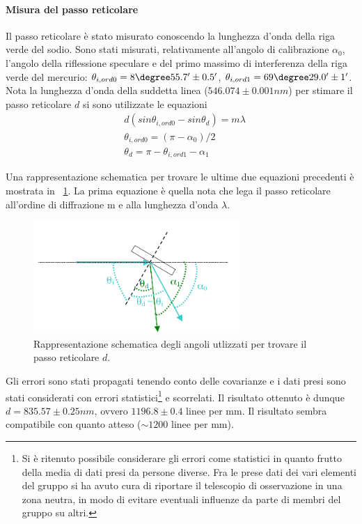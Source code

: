 \documentclass[a4paper,10pt]{article}
\begin{document}
{{{{{\paragraph{Misura del passo reticolare}
Il passo reticolare è stato misurato conoscendo la lunghezza d'onda della riga verde del sodio. Sono stati misurati, relativamente all'angolo di calibrazione $\alpha_0$, l'angolo della riflessione speculare e del primo massimo di interferenza della riga verde del mercurio: $\theta_{i,ord0} = 8\degree 55.7' \pm 0.5'$, $\theta_{i,ord1} = 69\degree 29.0'\pm 1'$. Nota la lunghezza d'onda della suddetta linea ($546.074 \pm 0.001 nm$) per stimare il passo reticolare $d$ si sono utilizzate le equazioni
\begin{align*}
&d(sin \theta_{i,ord0} - sin \theta_d) = m\lambda\\
&\theta_{i,ord0} = (\pi - \alpha_0)/2\\
&\theta_d = \pi - \theta_{i,ord1} - \alpha_1
\end{align*}

Una rappresentazione schematica per trovare le ultime due equazioni precedenti è mostrata in \figurename{~\ref{fig:angoli}}. La prima equazione è quella nota che lega il passo reticolare all'ordine di diffrazione m e alla lunghezza d'onda $\lambda$.


\begin{figure}[H]
	\centering
	\includegraphics[width=0.7\textwidth]{../grafici/Angoli.png}
	\caption{Rappresentazione schematica degli angoli utlizzati per trovare il passo reticolare $d$.}
	\label{fig:angoli}
\end{figure}

Gli errori sono stati propagati tenendo conto delle covarianze e i dati presi sono stati considerati con errori statistici\footnote{Si è ritenuto possibile considerare gli errori come statistici in quanto frutto della media di dati presi da persone diverse. Fra le prese dati dei vari elementi del gruppo si ha avuto cura di riportare il telescopio di osservazione in una zona neutra, in modo di evitare eventuali influenze da parte di membri del gruppo su altri.} e scorrelati. 
Il risultato ottenuto è dunque $d=835.57 \pm 0.25 nm$, ovvero $1196.8 \pm 0.4$ linee per mm. Il risultato sembra compatibile con quanto atteso ($\sim 1200$ linee per mm).

}}}}}
\end{document}
